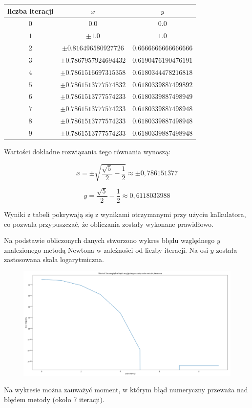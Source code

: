 \documentclass{article}
\begin{document}
	\begin{center}
		\begin{tabular}{c|c|c}
  			\hline 
  			liczba iteracji & $x$ & $y$\\
  			\hline
  			$0$ & $0.0$ & $0.0$\\
  			$1$ & $\pm 1.0$ & $1.0$\\
  			$2$ & $\pm 0.816496580927726$ & $0.6666666666666666$\\
			$3$ & $\pm 0.7867957924694432$ & $0.6190476190476191$\\
  			$4$ & $\pm 0.7861516697315358$ & $0.6180344478216818$\\
  			$5$ & $\pm 0.7861513777574832$ & $0.6180339887499892$\\
			$6$ & $\pm 0.7861513777574233$ & $0.6180339887498949$\\
  			$7$ & $\pm 0.7861513777574233$ & $0.6180339887498948$\\
  			$8$ & $\pm 0.7861513777574233$ & $0.6180339887498948$\\
			$9$ & $\pm 0.7861513777574233$ & $0.6180339887498948$\\
		\end{tabular} 
		
	\end{center}	

	Wartości dokładne rozwiązania tego równania wynoszą:

	\begin{equation}
		x = \pm \sqrt{\frac{\sqrt{5}}{2} - \frac{1}{2}} \approx \pm 0,786151377
	\end{equation}

	\begin{equation}
		y = \frac{\sqrt{5}}{2} - \frac{1}{2} \approx 0,6118033988
	\end{equation}


	Wyniki z tabeli pokrywają się z wynikami otrzymanymi przy użyciu kalkulatora, co pozwala przypuszczać, że obliczania zostały wykonane prawidłowo. 

	Na podstawie obliczonych danych stworzono wykres błędu względnego $y$ znalezionego metodą Newtona w zależności od liczby iteracji. Na osi $y$ została zastosowana skala logarytmiczna.


	\begin{figure}[h]
		\centering
		\includegraphics[scale = 0.3]{wykres3.png}
	\end{figure}

	Na wykresie można zauważyć moment, w którym błąd numeryczny przeważa nad błędem metody (około 7 iteracji).



	



	
	
	
	
	
	
	
	
	
\end{document}
